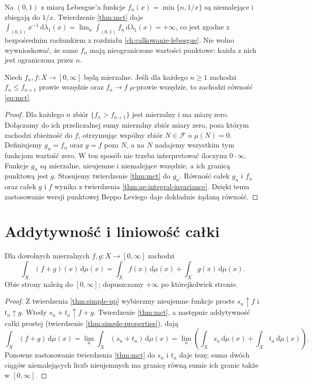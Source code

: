 \begin{przyklad}
Na $(0,1)$ z miarą Lebesgue'a funkcje
$f_n(x)=\min\{n,1/x\}$ są niemalejące i zbiegają
do $1/x$. Twierdzenie \ref{thm:mct} daje
$\int_{(0,1)}x^{-1}\,\mathrm d\lambda_1(x)=
\lim_n\int_{(0,1)}f_n\,\mathrm d\lambda_1(x)=+\infty$,
co jest zgodne z bezpośrednim rachunkiem z
rozdziału \ref{ch:calkowanie-lebesgue}.
Nie wolno wywnioskować, że same $f_n$ mają
nieograniczone wartości punktowe: każda z nich
jest ograniczona przez $n$.
\end{przyklad}

\begin{twierdzenie}
\label{thm:mct-ae}
Niech $f_n,f:X\to[0,\infty]$ będą mierzalne.
Jeśli dla każdego $n\ge1$ zachodzi $f_n\le f_{n+1}$ prawie wszędzie oraz $f_n\to f$
$\mu$-prawie wszędzie, to zachodzi równość
\eqref{eq:mct}.
\end{twierdzenie}
\begin{proof}
Dla każdego $n$ zbiór $\{f_n>f_{n+1}\}$ jest mierzalny i ma miarę zero.
Dołączamy do ich przeliczalnej sumy mierzalny zbiór miary zero,
poza którym zachodzi zbieżność do $f$, otrzymując wspólny
zbiór $N\in\mathcal F$ o $\mu(N)=0$.
Definiujemy $g_n=f_n$ oraz $g=f$ poza $N$,
a na $N$ nadajemy wszystkim tym funkcjom wartość zero.
W ten sposób nie trzeba interpretować iloczynu $0\cdot\infty$.
Funkcje $g_n$ są mierzalne, nieujemne i niemalejące wszędzie,
a ich granicą punktową jest $g$.
Stosujemy twierdzenie \ref{thm:mct} do $g_n$.
Równość całek $g_n$ i $f_n$ oraz całek $g$ i $f$
wynika z twierdzenia \ref{thm:ae-integral-invariance}.
Dzięki temu zastosowanie wersji punktowej
Beppo Leviego daje dokładnie żądaną równość.
\end{proof}

\section{Addytywność i liniowość całki}

\begin{twierdzenie}
\label{thm:positive-additivity}
Dla dowolnych mierzalnych $f,g:X\to[0,\infty]$
zachodzi
\begin{equation}\label{eq:positive-additivity}
\int_X(f+g)(x)\,\mathrm d\mu(x)
=\int_Xf(x)\,\mathrm d\mu(x)+
\int_Xg(x)\,\mathrm d\mu(x).
\end{equation}
Obie strony należą do $[0,\infty]$; dopuszczamy
$+\infty$ po którejkolwiek stronie.
\end{twierdzenie}
\begin{proof}
Z twierdzenia \ref{thm:simple-up} wybierzmy
nieujemne funkcje proste $s_n\uparrow f$ i
$t_n\uparrow g$. Wtedy $s_n+t_n\uparrow f+g$.
Twierdzenie \ref{thm:mct}, a następnie addytywność
całki prostej (twierdzenie \ref{thm:simple-properties}), dają
\[
\int_X(f+g)\,\mathrm d\mu(x)
=\lim_n\int_X(s_n+t_n)\,\mathrm d\mu(x)
=\lim_n\left(\int_Xs_n\,\mathrm d\mu(x)+
\int_Xt_n\,\mathrm d\mu(x)\right).
\]
Ponowne zastosowanie twierdzenia \ref{thm:mct}
do $s_n$ i $t_n$ daje tezę; suma dwóch ciągów
niemalejących liczb nieujemnych ma granicę równą
sumie ich granic także w $[0,\infty]$.
\end{proof}

